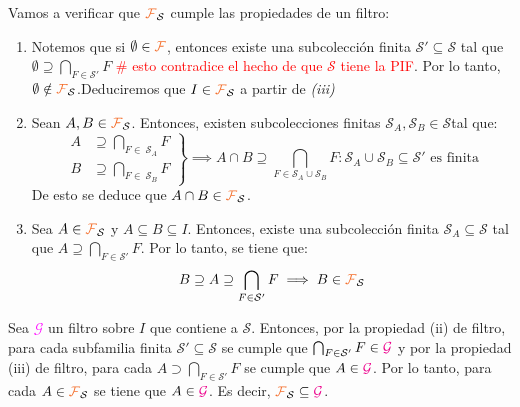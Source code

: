 \documentclass[titlepage,11pt,a4paper]{book}
\newcommand{\filt}{\ensuremath{\textcolor{Orange}{\mathcal{F}}}}
\begin{document}
\begin{dem}

    Vamos a verificar que $\filt_{\mathcal{S}}$ cumple las propiedades de un filtro:
    \begin{enumerate}
        \item[(i)] Notemos que si $\emptyset \in \filt$, entonces existe una subcolección finita $\mathcal{S}' \subseteq \mathcal{S}$ tal que $\emptyset \supseteq \bigcap_{F \in \mathcal S'} F$ \textcolor{red}{\# esto contradice el hecho de que $\mathcal S$ tiene la PIF}. Por lo tanto, $\emptyset \notin \filt_{\mathcal{S}}$.Deduciremos que $I \in \filt_{\mathcal{S}}$ a partir de \emph{(iii)}
        \item[(ii)] Sean $A, B \in \filt_{\mathcal S}$. Entonces, existen subcolecciones finitas $\mathcal{S}_{A}, \mathcal{S}_{B} \in \mathcal S$tal que:
    \[
     \left.
     \begin{aligned}
            A &\supseteq \bigcap_{F \in \ \mathcal{S}_{A}} F \\
            B &\supseteq \bigcap_{F \in \ \mathcal{S}_{B}} F
        \end{aligned}
        \right\} \implies A \cap B \supseteq \bigcap_{F \in \mathcal{S}_{A} \cup \mathcal{S}_{B}} F \colon \mathcal{S}_{A} \cup \mathcal{S}_{B} \subseteq \mathcal S' \text{ es finita}
       \]
       De esto se deduce que $A \cap B \in \filt_{\mathcal S}$.
        \item[(iii)] Sea $A \in \filt_{\mathcal S}$ y $A \subseteq B \subseteq I$. Entonces, existe una subcolección finita $\mathcal{S}_{A} \subseteq \mathcal S$ tal que $A \supseteq \bigcap_{F \in \mathcal{S}'} F$. Por lo tanto, se tiene que:
        \[
        B \supseteq A \supseteq \bigcap_{F \in \mathcal{S}'} F \implies B \in \filt_{\mathcal S}
        \]
    \end{enumerate}

    \medskip
    Sea \textcolor{magenta}{$\mathcal G$} un filtro sobre $I$ que contiene a $\mathcal S$. Entonces, por la propiedad (ii) de filtro, para cada subfamilia finita $\mathcal S' \subseteq \mathcal S$ se cumple que
    \(\bigcap_{F \in \mathcal S'} F \in \textcolor{magenta}{\mathcal G}\) y por la propiedad (iii) de filtro, para cada $A \supset \bigcap_{F \in \mathcal S'} F$ se cumple que $A \in \textcolor{magenta}{\mathcal G}$. Por lo tanto, para cada $A \in \filt_{\mathcal S}$ se tiene que $A \in \textcolor{magenta}{\mathcal G}$. Es decir, $\filt_{\mathcal S} \subseteq \textcolor{magenta}{\mathcal G}$.
    
\end{dem}
\end{document}
